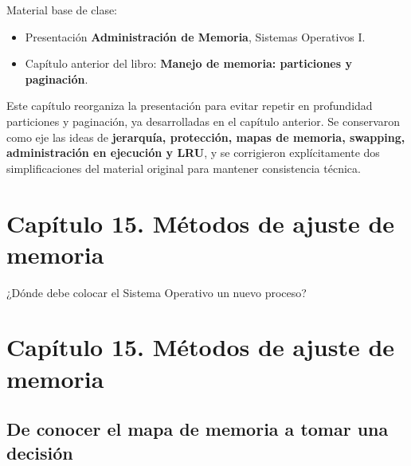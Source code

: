 \documentclass[
  spanish,
  letterpaper,
]{scrbook}
\providecommand{\tightlist}{%
  \setlength{\itemsep}{0pt}\setlength{\parskip}{0pt}}
\begin{document}
Material base de clase:

\begin{itemize}
\tightlist
\item
  Presentación \textbf{Administración de Memoria}, Sistemas Operativos
  I.
\item
  Capítulo anterior del libro: \textbf{Manejo de memoria: particiones y
  paginación}.
\end{itemize}

\begin{tcolorbox}[enhanced jigsaw, arc=.35mm, bottomrule=.15mm, bottomtitle=1mm, breakable, colback=white, colbacktitle=quarto-callout-note-color!10!white, colframe=quarto-callout-note-color-frame, coltitle=black, left=2mm, leftrule=.75mm, opacityback=0, opacitybacktitle=0.6, rightrule=.15mm, title=\textcolor{quarto-callout-note-color}{\faInfo}\hspace{0.5em}{Criterio editorial}, titlerule=0mm, toprule=.15mm, toptitle=1mm]

Este capítulo reorganiza la presentación para evitar repetir en
profundidad particiones y paginación, ya desarrolladas en el capítulo
anterior. Se conservaron como eje las ideas de \textbf{jerarquía,
protección, mapas de memoria, swapping, administración en ejecución y
LRU}, y se corrigieron explícitamente dos simplificaciones del material
original para mantener consistencia técnica.

\end{tcolorbox}


\chapter{Capítulo 15. Métodos de ajuste de
memoria}\label{capuxedtulo-15.-muxe9todos-de-ajuste-de-memoria}

¿Dónde debe colocar el Sistema Operativo un nuevo proceso?

\hfill\break


\chapter{Capítulo 15. Métodos de ajuste de
memoria}\label{capuxedtulo-15.-muxe9todos-de-ajuste-de-memoria-1}

\section{De conocer el mapa de memoria a tomar una
decisión}\label{de-conocer-el-mapa-de-memoria-a-tomar-una-decisiuxf3n}
\end{document}
